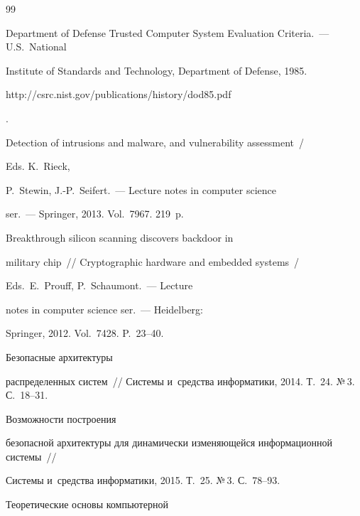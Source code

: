 {\small\frenchspacing


{%




\begin{thebibliography}{99}




     Department of Defense Trusted Computer System Evaluation Criteria.~--- U.S.\ National 


Institute of Standards and Technology, Department of Defense, 1985. {\sf 


http://csrc.nist.gov/publications/history/dod85.pdf}.




     Detection of intrusions and malware, and vulnerability assessment~/


      Eds. K.~Rieck, 


P.~Stewin, J.-P.~Seifert.~--- Lecture notes in computer science


ser.~--- Springer, 2013. Vol.~7967. 219~p.




      Breakthrough silicon scanning discovers backdoor in 


military chip~/\!\!/ Cryptographic hardware and embedded systems~/


Eds.\ E.~Prouff, P.~Schaumont.~--- Lecture


notes in computer science ser.~--- Heidelberg: 


Springer, 2012. Vol.~7428. P.~23--40.




      Безопасные архитектуры 


распределенных систем~/\!\!/ Системы и~средства информатики, 2014. Т.~24. №\,3. С.~18--31.




      Возможности построения 


без\-опас\-ной архитектуры для динамически изменяющейся информационной системы~/\!\!/ 


Системы и~средства информатики, 2015. Т.~25. №\,3. С.~78--93.




      Теоретические основы компьютерной 



\end{thebibliography}}}
